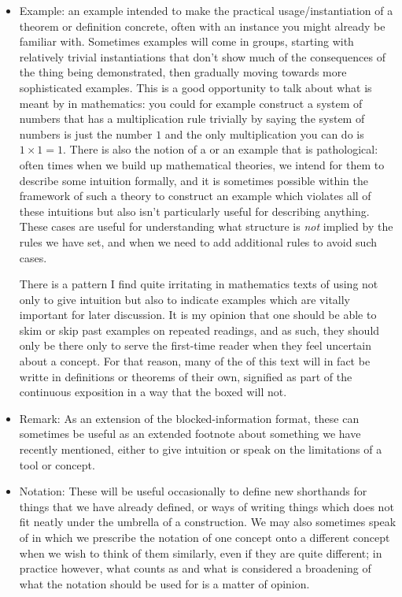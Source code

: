 \documentclass[11pt]{article}
\begin{document}
\begin{itemize}
    \item Example: an example intended to make the practical usage/instantiation of a theorem or definition concrete, often with an instance you might already be familiar with. Sometimes examples will come in groups, starting with relatively trivial instantiations that don't show much of the consequences of the thing being demonstrated, then gradually moving towards more sophisticated examples. This is a good opportunity to talk about what is meant by  in mathematics: you could for example construct a system of numbers that has a multiplication rule trivially by saying the system of numbers is just the number $1$ and the only multiplication you can do is $1 \times 1 = 1$. There is also the notion of a  or an example that is pathological: often times when we build up mathematical theories, we intend for them to describe some intuition formally, and it is sometimes possible within the framework of such a theory to construct an example which violates all of these intuitions but also isn't particularly useful for describing anything. These cases are useful for understanding what structure is \emph{not} implied by the rules we have set, and when we need to add additional rules to avoid such cases.
    
There is a pattern I find quite irritating in mathematics texts of using  not only to give intuition but also to indicate examples which are vitally important for later discussion. It is my opinion that one should be able to skim or skip past examples on repeated readings, and as such, they should only be there only to serve the first-time reader when they feel uncertain about a concept. For that reason, many of the  of this text will in fact be writte in definitions or theorems of their own, signified as part of the continuous exposition in a way that the boxed  will not.

    \item Remark: As an extension of the blocked-information format, these can sometimes be useful as an extended footnote about something we have recently mentioned, either to give intuition or speak on the limitations of a tool or concept.

    \item Notation: These will be useful occasionally to define new shorthands for things that we have already defined, or ways of writing things which does not fit neatly under the umbrella of a construction. We may also sometimes speak of  in which we prescribe the notation of one concept onto a different concept when we wish to think of them similarly, even if they are quite different; in practice however, what counts as  and what is considered a broadening of what the notation should be used for is a matter of opinion.
\end{itemize}
\end{document}

